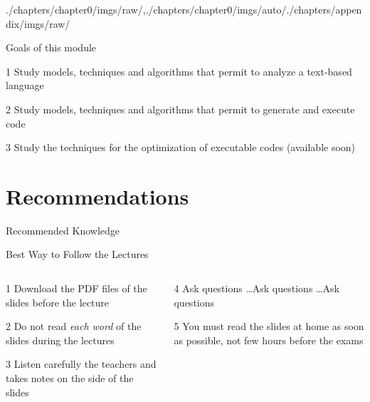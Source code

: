 \begin{graphicspathcontext}{{./chapters/chapter0/imgs/raw/},{./chapters/chapter0/imgs/auto/}{./chapters/appendix/imgs/raw/}}
\begin{frame}{Goals of this module}
	\begin{leftanchorblock}{}{1}
		Study models, techniques and algorithms that permit to analyze a text-based language
	\end{leftanchorblock}
	\vspace{0.5cm}
	\begin{rightanchorblock}{}{2}
		Study models, techniques and algorithms that permit to generate and execute code
	\end{rightanchorblock}
	\begin{leftanchorblock}{}{3}
		Study the techniques for the optimization of executable codes \alert{(available soon)}
	\end{leftanchorblock}
\end{frame}

\tableofcontentslide[onlyparts]

\section{Recommendations}

\begin{frame}{Recommended Knowledge}
	\hfill
	\hfill
\end{frame}

\begin{frame}{{Best Way} to Follow the Lectures}
	\begin{columns}
		\begin{column}{.5\linewidth}
			\begin{rightanchorblock}{}{1}
				Download the PDF files of the slides before the lecture
			\end{rightanchorblock}
			\begin{rightanchorblock}{}{2}
				Do not read \emph{each word} of the slides during the lectures
			\end{rightanchorblock}
			\begin{rightanchorblock}{}{3}
				Listen carefully the teachers and takes notes on the side of the slides
			\end{rightanchorblock}
		\end{column}
		\begin{column}{.5\linewidth}
			\begin{leftanchorblock}{}{4}
				Ask questions \dots Ask questions \dots Ask questions
			\end{leftanchorblock}
			\vspace{.5cm}
			\begin{leftanchorblock}{}{5}
				You must read the slides at home as soon as possible, not few hours before the exams
			\end{leftanchorblock}
		\end{column}
	\end{columns}
\end{frame}


\end{graphicspathcontext}
